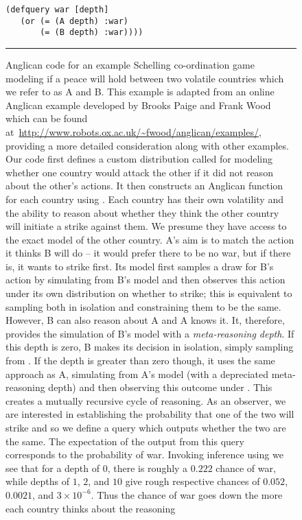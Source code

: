 \begin{figure}[t]
\begin{lstlisting}[basicstyle=\ttfamily\footnotesize,multicols=2,frame=none]
 (defquery war [depth]
   (or (= (A depth) :war)
       (= (B depth) :war))))
\end{lstlisting}	
\vspace{-20pt}		
\rule{\linewidth}{0.4pt}
		\caption{Anglican code for an example Schelling co-ordination game~\citep{schelling1980strategy,stuhlmuller2014reasoning}
		modeling if a peace will hold between two volatile countries which we refer to as A and B.
		This example is adapted from an online Anglican example developed by Brooks Paige and Frank Wood
		which can be found at~\url{http://www.robots.ox.ac.uk/~fwood/anglican/examples/}, providing a more
		detailed consideration along with other examples.
		Our code first defines a custom distribution called  for modeling whether one country would
		attack the other if it did not reason about the other's actions.  
It then constructs an Anglican function for each country using .  
Each country has their own volatility and the ability to reason about whether they think the other country will
initiate a strike against them. We presume they have access to the exact model of the other country.  A's aim is to match
the action it thinks B will do -- it would prefer there to be no war, but if there is, it wants to strike
first.  Its model first samples a draw for B's action by simulating from B's model and then observes this action
under its own distribution on whether to strike; this is equivalent to sampling both in isolation and constraining
them to be the same.  However, B can also reason about A and
A knows it.  It, therefore, provides the simulation of B's model with a \emph{meta-reasoning depth}.  If this depth
is zero, B makes its decision in isolation, simply sampling from .  If the depth is greater 
than zero though, it uses the same approach as A, simulating from A's model (with a depreciated meta-reasoning 
depth) and then observing this 
outcome under .  This creates a mutually recursive cycle of reasoning.  As an observer, we are
interested in establishing the probability that one of the two will strike
and so we define a query which outputs whether the two are the same.
The expectation of the output from this query corresponds to the probability of war.
Invoking inference using  we see that for a depth of $0$, there
is roughly a $0.222$ chance of war, while depths of $1$, $2$, and $10$ give rough respective chances of $0.052$, $0.0021$,
and $3\times10^{-6}$.  Thus the chance of war goes down the more each country thinks about the reasoning
}
\end{figure}
